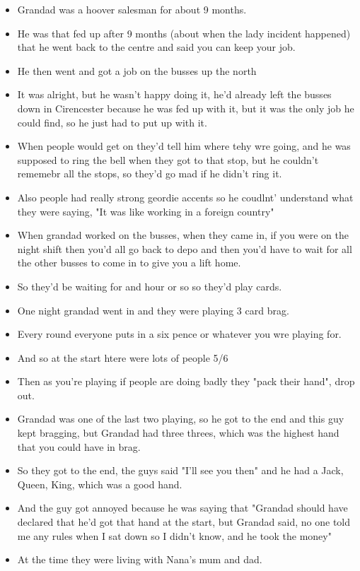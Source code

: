 \documentclass[10pt,twocolumn,letterpaper]{article}
\begin{document}
\begin{itemize}
    \item Grandad was a hoover salesman for about 9 months.
    \item He was that fed up after 9 months (about when the lady incident happened) that he went back to the centre and said you can keep your job.
    \item He then went and got a job on the busses up the north
    \item It was alright, but he wasn't happy doing it, he'd already left the busses down in Cirencester because he was fed up with it, but it was the only job he could find, so he just had to put up with it.
    \item When people would get on they'd tell him where tehy wre going, and he was supposed to ring the bell when they got to that stop, but he couldn't rememebr all the stops, so they'd go mad if he didn't ring it.
    \item Also people had really strong geordie accents so he coudlnt' understand what they were saying, "It was like working in a foreign country"
    \item When grandad worked on the busses, when they came in, if you were on the night shift then you'd all go back to depo and then you'd have to wait for all the other busses to come in to give you a lift home.
    \item So they'd be waiting for and hour or so so they'd play cards.
    \item One night grandad went in and they were playing 3 card brag.
    \item Every round everyone puts in a six pence or whatever you wre playing for.
    \item And so at the start htere were lots of people 5/6
    \item Then as you're playing if people are doing badly they "pack their hand", drop out.
    \item Grandad was one of the last two playing, so he got to the end and this guy kept bragging, but Grandad had three threes, which was the highest hand that you could have in brag.
    \item So they got to the end, the guys said "I'll see you then" and he had a Jack, Queen, King, which was a good hand.
    \item And the guy got annoyed because he was saying that "Grandad should have declared that he'd got that hand at the start, but Grandad said, no one told me any rules when I sat down so I didn't know, and he took the money"
    \item At the time they were living with Nana's mum and dad.

\end{itemize}
\end{document}
